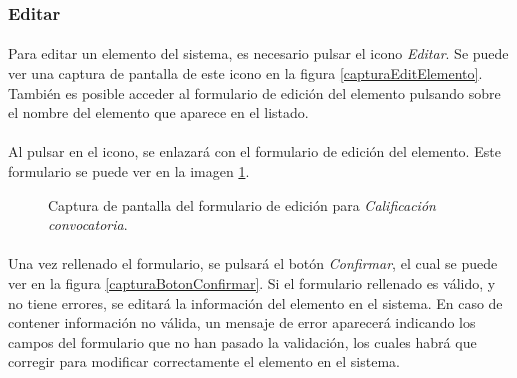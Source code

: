 \subsubsection{Editar}

  \paragraph{}Para editar un elemento del sistema, es necesario pulsar el
  icono \textit{Editar}. Se puede ver una captura de pantalla de este
  icono en la figura \ref{capturaEditElemento}. También es posible acceder
  al formulario de edición del elemento pulsando sobre el nombre del elemento
  que aparece en el listado.

  \paragraph{}Al pulsar en el icono, se enlazará con el formulario de edición
  del elemento. Este formulario se puede ver en la imagen
  \ref{capturaEditCalificacion}.

  \begin{figure}[!ht]
    \begin{center}
      \caption{Captura de pantalla del formulario de edición para \textit{Calificación convocatoria}.}
      \label{capturaEditCalificacion}
    \end{center}
  \end{figure}

  \paragraph{}Una vez rellenado el formulario, se pulsará el botón
  \textit{Confirmar}, el cual se puede ver en la figura
  \ref{capturaBotonConfirmar}. Si el formulario rellenado es válido, y no tiene
  errores, se editará la información del elemento en el sistema. En caso de
  contener información no válida, un mensaje de error aparecerá indicando los
  campos del formulario que no han pasado la validación, los cuales habrá que
  corregir para modificar correctamente el elemento en el sistema.

